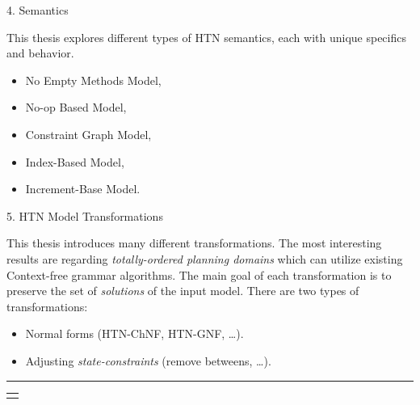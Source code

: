 \documentclass[portrait,a0paper,fontscale=0.25]{baposter}
\renewcommand{\arraystretch}{1.5}
\begin{document}
\begin{poster}
%
%
%

\begin{posterbox}[column=0, name=semantics, below=motivation]{4. Semantics}

This thesis explores different types of HTN semantics, each with unique specifics and behavior.

\begin{itemize}
    \item No Empty Methods Model,
    \item No-op Based Model,
    \item Constraint Graph Model,
    \item Index-Based Model,
    \item Increment-Base Model.
\end{itemize}

\end{posterbox}

\begin{posterbox}[column=1, name=trans]{5. HTN Model Transformations}

This thesis introduces many different transformations. The most interesting results are regarding \emph{totally-ordered planning domains} which can utilize existing Context-free grammar algorithms. The main goal of each transformation is to preserve the set of \emph{solutions} of the input model. There are two types of transformations:

\begin{itemize}
    \item Normal forms (HTN-ChNF, HTN-GNF, \dots).
    \item Adjusting \emph{state-constraints} (remove betweens, \dots).
\end{itemize}

\rule{\linewidth}{0.4pt}

\renewcommand{\arraystretch}{0.1}
\begin{tabular}{p{0.95\linewidth}}
\begin{center}
\begin{tikzpicture}
    \tikzset{emptydot/.style={fill=white,circle}}
    \tikzset{base/.style = {rectangle, rounded corners, draw=black,
                           minimum width=1.5cm, minimum height=0.5cm,
                           text centered, font=\sffamily\tiny}}
    \tikzset{action/.style = {base, fill=blue!30}}
    \tikzset{abstract/.style = {base, fill=orange!15}}


\end{tikzpicture}
\end{center}
\end{tabular}
\end{posterbox}
\end{poster}
\end{document}
